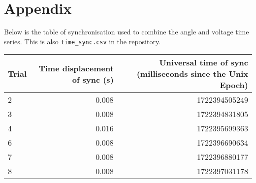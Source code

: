 \section*{Appendix}

Below is the table of synchronisation used to combine the angle and voltage time series. This is also \verb|time_sync.csv| in the repository.

\begin{table}
\label{tab:SynchronisationTable}
\begin{center}
\begin{tabular}{|lrr|}

\hline
Trial & Time displacement of sync (s) & Universal time of sync (milliseconds since the Unix Epoch) \\
\hline
2 & 0.008 & 1722394505249 \\
3 & 0.008 & 1722394831805 \\
4 & 0.016 & 1722395699363 \\
6 & 0.008 & 1722396690634 \\
7 & 0.008 & 1722396880177 \\
8 & 0.008 & 1722397031178 \\
\hline
\end{tabular}

\end{center}
\end{table}
